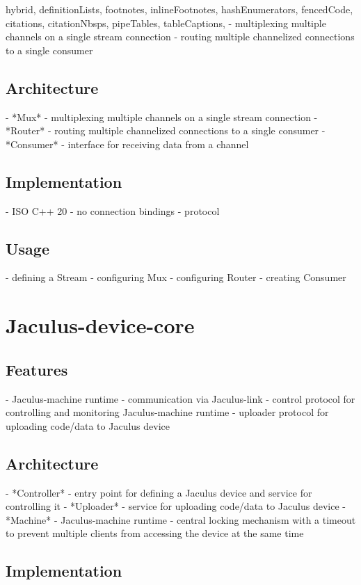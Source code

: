 \documentclass[
  digital,
  oneside,
  nosansbold,
  nocolorbold,
  lof,
  lot
]{fithesis4}
\begin{document}
\begin{markdown*}{%
  hybrid,
  definitionLists,
  footnotes,
  inlineFootnotes,
  hashEnumerators,
  fencedCode,
  citations,
  citationNbsps,
  pipeTables,
  tableCaptions,
}
  - multiplexing multiple channels on a single stream connection
  - routing multiple channelized connections to a single consumer

\section{Architecture}

  - *Mux* - multiplexing multiple channels on a single stream connection
  - *Router* - routing multiple channelized connections to a single consumer
  - *Consumer* - interface for receiving data from a channel

\section{Implementation}

  - ISO C++ 20
  - no connection bindings
  - protocol

\section{Usage}

  - defining a Stream
  - configuring Mux
  - configuring Router
  - creating Consumer


\chapter{Jaculus-device-core}

\section{Features}

  - Jaculus-machine runtime
  - communication via Jaculus-link
  - control protocol for controlling and monitoring Jaculus-machine runtime
  - uploader protocol for uploading code/data to Jaculus device

\section{Architecture}

  - *Controller* - entry point for defining a Jaculus device and service for controlling it
  - *Uploader* - service for uploading code/data to Jaculus device
  - *Machine* - Jaculus-machine runtime
  - central locking mechanism with a timeout to prevent multiple clients from accessing the device at the same time

\section{Implementation}


\end{markdown*}
\end{document}
